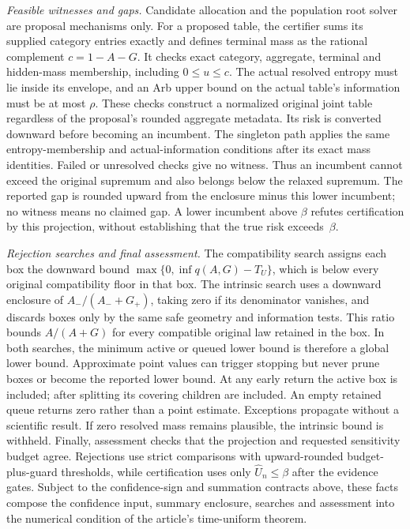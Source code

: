 \emph{Feasible witnesses and gaps.} Candidate allocation and the population root solver are proposal mechanisms only. For a proposed table, the certifier sums its supplied category entries exactly and defines terminal mass as the rational complement $c=1-A-G$. It checks exact category, aggregate, terminal and hidden-mass membership, including $0\le u\le c$. The actual resolved entropy must lie inside its envelope, and an Arb upper bound on the actual table's information must be at most $\rho$. These checks construct a normalized original joint table regardless of the proposal's rounded aggregate metadata. Its risk is converted downward before becoming an incumbent. The singleton path applies the same entropy-membership and actual-information conditions after its exact mass identities. Failed or unresolved checks give no witness. Thus an incumbent cannot exceed the original supremum and also belongs below the relaxed supremum. The reported gap is rounded upward from the enclosure minus this lower incumbent; no witness means no claimed gap. A lower incumbent above $\beta$ refutes certification by this projection, without establishing that the true risk exceeds~$\beta$.

\emph{Rejection searches and final assessment.} The compatibility search assigns each box the downward bound $\max\{0,\inf q(A,G)-T_U\}$, which is below every original compatibility floor in that box. The intrinsic search uses a downward enclosure of $A_-/(A_-+G_+)$, taking zero if its denominator vanishes, and discards boxes only by the same safe geometry and information tests. This ratio bounds $A/(A+G)$ for every compatible original law retained in the box. In both searches, the minimum active or queued lower bound is therefore a global lower bound. Approximate point values can trigger stopping but never prune boxes or become the reported lower bound. At any early return the active box is included; after splitting its covering children are included. An empty retained queue returns zero rather than a point estimate. Exceptions propagate without a scientific result. If zero resolved mass remains plausible, the intrinsic bound is withheld. Finally, assessment checks that the projection and requested sensitivity budget agree. Rejections use strict comparisons with upward-rounded budget-plus-guard thresholds, while certification uses only $\widehat U_n\le\beta$ after the evidence gates. Subject to the confidence-sign and summation contracts above, these facts compose the confidence input, summary enclosure, searches and assessment into the numerical condition of the article's time-uniform theorem.

